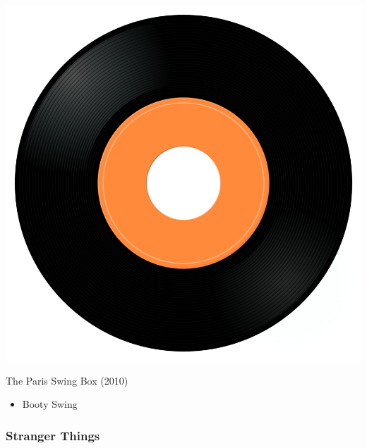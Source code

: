 \begin{minipage}[t]{0.25\textwidth}\vspace{0pt}
\captionsetup{type=figure}
\includegraphics[width=\textwidth]{Images/cover.png}
\caption*{The Paris Swing Box (2010)}
\end{minipage}
\begin{minipage}[t]{0.25\textwidth}\vspace{0pt}
\begin{itemize}[nosep,leftmargin=1em,labelwidth=*,align=left]
	\setlength{\itemsep}{0pt}
	\item Booty Swing
\end{itemize}
\end{minipage}

\subsubsection{Stranger Things}

